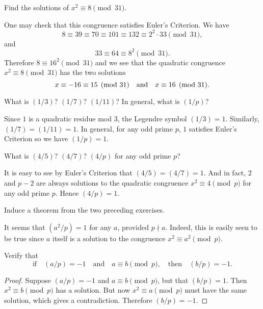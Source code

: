  Find the solutions of $x^2\equiv8\pmod{31}$.
\begin{solution}
  One may check that this congruence satisfies Euler's Criterion. We
  have
  \begin{equation*}
    8\equiv39\equiv70\equiv101\equiv132
    \equiv2^2\cdot33\pmod{31},
  \end{equation*}
  and
  \begin{equation*}
    33\equiv64\equiv8^2\pmod{31}.
  \end{equation*}
  Therefore $8\equiv16^2\pmod{31}$ and we see that the quadratic
  congruence $x^2\equiv8\pmod{31}$ has the two solutions
  \begin{equation*}
    x\equiv-16\equiv15\pmod{31}
    \quad\text{and}\quad
    x\equiv16\pmod{31}. \qedhere
  \end{equation*}
\end{solution}

 What is $(1/3)$? $(1/7)$? $(1/11)$? In general, what is
$(1/p)$?
\begin{solution}
  Since $1$ is a quadratic residue mod $3$, the Legendre symbol
  $(1/3) = 1$. Similarly, $(1/7) = (1/11) = 1$. In general, for any
  odd prime $p$, $1$ satisfies Euler's Criterion so we have
  $(1/p) = 1$.
\end{solution}

\label{exercise:quad-cong:leg-sym-4-over-p}
What is $(4/5)$? $(4/7)$? $(4/p)$ for any odd prime $p$?
\begin{solution}
  It is easy to see by Euler's Criterion that $(4/5) = (4/7) = 1$. And
  in fact, $2$ and $p - 2$ are always solutions to the quadratic
  congruence $x^2\equiv4\pmod{p}$ for any odd prime $p$. Hence
  $(4/p) = 1$.
\end{solution}

 Induce a theorem from the two preceding exercises.
\begin{solution}
  It seems that $(a^2/p) = 1$ for any $a$, provided $p\nmid
  a$. Indeed, this is easily seen to be true since $a$ itself is a
  solution to the congruence $x^2\equiv a^2\pmod{p}$.
\end{solution}

 Verify that
\begin{equation*}
  \text{if}\quad
  (a/p) = -1
  \quad\text{and}\quad
  a\equiv b\pmod{p},
  \quad\text{then}\quad
  (b/p) = -1.
\end{equation*}
\begin{proof}
  Suppose $(a/p) = -1$ and $a\equiv b\pmod{p}$, but that $(b/p) =
  1$. Then $x^2\equiv b\pmod{p}$ has a solution. But now
  $x^2\equiv a\pmod{p}$ must have the same solution, which gives a
  contradiction. Therefore $(b/p) = -1$.
\end{proof}


